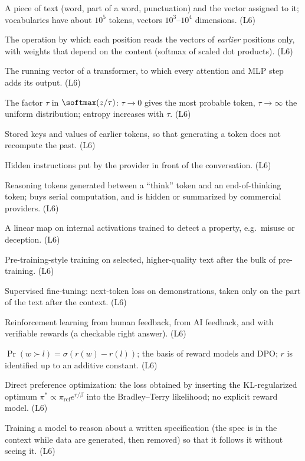\item[Token, embedding] A piece of text (word, part of a word, punctuation) and the vector assigned to it; vocabularies have about $10^5$ tokens, vectors $10^3$--$10^4$ dimensions. (L6)
\item[Causal attention] The operation by which each position reads the vectors of \emph{earlier} positions only, with weights that depend on the content (softmax of scaled dot products). (L6)
\item[Residual stream] The running vector of a transformer, to which every attention and MLP step adds its output. (L6)
\item[Temperature] The factor $\tau$ in $\softmax(z/\tau)$: $\tau\to0$ gives the most probable token, $\tau\to\infty$ the uniform distribution; entropy increases with $\tau$. (L6)
\item[KV cache] Stored keys and values of earlier tokens, so that generating a token does not recompute the past. (L6)
\item[System prompt] Hidden instructions put by the provider in front of the conversation. (L6)
\item[Chain of thought] Reasoning tokens generated between a ``think'' token and an end-of-thinking token; buys serial computation, and is hidden or summarized by commercial providers. (L6)
\item[Linear probe] A linear map on internal activations trained to detect a property, e.g.\ misuse or deception. (L6)
\item[Mid-training] Pre-training-style training on selected, higher-quality text after the bulk of pre-training. (L6)
\item[SFT] Supervised fine-tuning: next-token loss on demonstrations, taken only on the part of the text after the context. (L6)
\item[RLHF, RLAIF, RLVR] Reinforcement learning from human feedback, from AI feedback, and with verifiable rewards (a checkable right answer). (L6)
\item[Bradley--Terry model] $\Pr(w\succ l)=\sigma(r(w)-r(l))$; the basis of reward models and DPO; $r$ is identified up to an additive constant. (L6)
\item[DPO] Direct preference optimization: the loss obtained by inserting the KL-regularized optimum $\pi^*\propto\pi_{\mathrm{ref}}e^{r/\beta}$ into the Bradley--Terry likelihood; no explicit reward model. (L6)
\item[Deliberative alignment] Training a model to reason about a written specification (the spec is in the context while data are generated, then removed) so that it follows it without seeing it. (L6)

